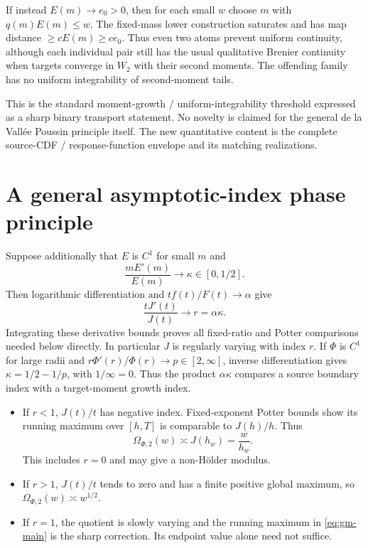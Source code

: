 If instead \(E(m)\to e_0>0\), then for each small \(w\) choose \(m\) with \(q(m)E(m)\le w\). The fixed-mass lower construction saturates and has map distance \(\ge cE(m)\ge ce_0\). Thus even two atoms prevent uniform continuity, although each individual pair still has the usual qualitative Brenier continuity when targets converge in \(W_2\) with their second moments. The offending family has no uniform integrability of second-moment tails.

This is the standard moment-growth / uniform-integrability threshold expressed as a sharp binary transport statement. No novelty is claimed for the general de la Vall\'ee Poussin principle itself. The new quantitative content is the complete source-CDF / response-function envelope and its matching realizations.

\section{A general asymptotic-index phase principle}\label{sec:gm-index}

Suppose additionally that \(E\) is \(C^1\) for small \(m\) and
\[
 \frac{mE'(m)}{E(m)}\longrightarrow\kappa\in[0,1/2].
\]
Then logarithmic differentiation and \(tf(t)/F(t)\to\alpha\) give
\[
 \frac{tJ'(t)}{J(t)}\longrightarrow r=\alpha\kappa.
\]
Integrating these derivative bounds proves all fixed-ratio and Potter comparisons needed below directly. In particular \(J\) is regularly varying with index \(r\). If \(\Phi\) is \(C^1\) for large radii and \(r\Phi'(r)/\Phi(r)\to p\in[2,\infty]\), inverse differentiation gives \(\kappa=1/2-1/p\), with \(1/\infty=0\). Thus the product \(\alpha\kappa\) compares a source boundary index with a target-moment growth index.

\begin{itemize}
\item If \(r<1\), \(J(t)/t\) has negative index. Fixed-exponent Potter bounds show its running maximum over \([h,T]\) is comparable to \(J(h)/h\). Thus
\[
 \Omega_{\Phi,2}(w)\asymp J(h_w)=\frac w{h_w}.
\]
This includes \(r=0\) and may give a non-H\"older modulus.
\item If \(r>1\), \(J(t)/t\) tends to zero and has a finite positive global maximum, so \(\Omega_{\Phi,2}(w)\asymp w^{1/2}\).
\item If \(r=1\), the quotient is slowly varying and the running maximum in \eqref{eq:gm-main} is the sharp correction. Its endpoint value alone need not suffice.
\end{itemize}

